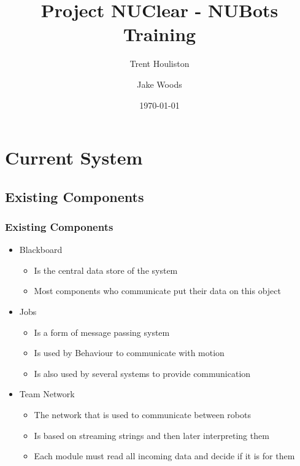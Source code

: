 \documentclass{beamer}
\title[Short title]{Project NUClear - NUBots Training}
\author{
	Trent Houliston \and Jake Woods
}
\institute[UoN]
{
	University of Newcastle \\ %
	\medskip
	\textit{Trent.Houliston@uon.edu.au, Jake.f.woods@gmail.com} %
}
\date{\today}
\begin{document}
\begin{frame}
	\titlepage %
\end{frame}


\begin{frame}
	\tableofcontents
\end{frame}

\section{Current System}
\subsection{Existing Components}
\begin{frame}
	\frametitle{Existing Components}
	\begin{itemize}
		\item Blackboard
			\begin{itemize}
				\item Is the central data store of the system
				\item Most components who communicate put their data on this object
			\end{itemize}
		\item Jobs
			\begin{itemize}
				\item Is a form of message passing system
				\item Is used by Behaviour to communicate with motion
				\item Is also used by several systems to provide communication
			\end{itemize}
		\item Team Network
			\begin{itemize}
				\item The network that is used to communicate between robots
				\item Is based on streaming strings and then later interpreting them
				\item Each module must read all incoming data and decide if it is for them
			\end{itemize}
	\end{itemize}
\end{frame}
\end{document}
